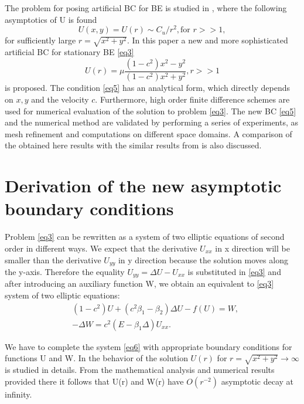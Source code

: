 \documentclass[12pt]{article}
\theoremstyle{theorem}
\theoremstyle{defi}
\begin{document}
The problem for posing artificial BC for BE is studied in \cite{ref6}, where the following asymptotics of U is found
\begin{equation}
U(x,y) = U(r) \sim  C_u/r^2, \text{for } r >> 1, \label{eq4}
\end{equation}
for sufficiently large $r=\sqrt{x^2 + y^2}$.
In this paper a new and more sophisticated artificial BC for stationary BE \eqref{eq3}
\begin{equation}
U(r) =  \mu \frac{(1-c^2)x^2 - y^2}{(1-c^2)x^2 + y^2}, r >> 1  \label{eq5}
\end{equation}
is proposed. The condition \eqref{eq5}  has an analytical form, which directly depends on $x,y$ and the velocity $c$. Furthermore, high order finite difference schemes are used for numerical evaluation of the solution to problem \eqref{eq3}. The new BC \eqref{eq5} and the numerical method are validated by performing a series of experiments, as mesh refinement and computations on different space domains. A comparison of the obtained here results with the similar results from  \cite{ref10} is also discussed.

\section{Derivation of the new asymptotic boundary conditions }

Problem \eqref{eq3} can be rewritten as a system of two elliptic equations of second order in different ways. We expect that the derivative  $U_{xx}$ in x direction will be smaller than the derivative $U_{yy}$  in y direction because the solution moves along the y-axis. Therefore the equality $U_{yy} = \Delta U - U_{xx}$  is substituted in \eqref{eq3} and after introducing an auxiliary function W, we obtain an equivalent to \eqref{eq3} system of two elliptic equations:
\begin{equation}\label{eq6}
\begin{split}
&(1-c^2) U + ( c^2\beta_1 -  \beta_2) \Delta U  - f (U) = W, \\
& -\Delta W = c^2  (E- \beta_1 \Delta) U_{xx}.
\end{split}
\end{equation}

We have to complete the system \eqref{eq6} with appropriate boundary conditions for functions U and W. In \cite{ref6} the behavior of the solution $U(r)$ for  $ r=\sqrt{x^2 + y^2}\rightarrow \infty$ is studied in details. From the mathematical analysis and numerical results provided there it follows that U(r) and W(r) have  $O(r^{-2})$ asymptotic decay at infinity.
\end{document}
